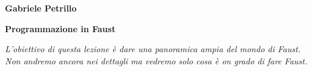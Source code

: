 \documentclass[11pt]{article}
\begin{document}
\begin{minipage}{0.55\linewidth}
\vspace{0.3cm}
\large{\textbf{Gabriele Petrillo}}\\
\end{minipage}

\vspace{0.3cm}
\begin{minipage}{0.95\linewidth}
\begin{center}
\huge{\textbf{Programmazione in Faust}} \\
\end{center}
\end{minipage}
\vspace*{0.2cm}


\begin{center}
\begin{minipage}[c]{14cm}


\textit{L'obiettivo di questa lezione è dare una panoramica ampia del mondo di Faust. Non andremo ancora nei dettagli ma vedremo solo cosa è on grado di fare Faust.}

\end{minipage}
\end{center}
\vspace*{0.2cm}

\setlength{\columnsep}{3em}
\end{document}
